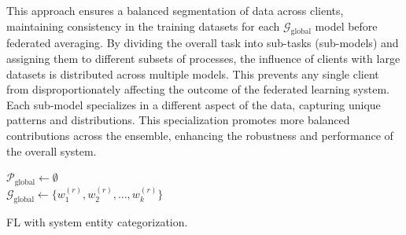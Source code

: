 This approach ensures a balanced segmentation of data across clients, maintaining consistency in the training datasets for each \( \mathcal{G}_{\text{global}} \) model before federated averaging. By dividing the overall task into sub-tasks (sub-models) and assigning them to different subsets of processes, the influence of clients with large datasets is distributed across multiple models. This prevents any single client from disproportionately affecting the outcome of the federated learning system. Each sub-model specializes in a different aspect of the data, capturing unique patterns and distributions. This specialization promotes more balanced contributions across the ensemble, enhancing the robustness and performance of the overall system.


\begin{algorithm}[!t]
  \scriptsize
  \DontPrintSemicolon
  \BlankLine
  $\mathcal{P}_{\text{global}} \leftarrow \emptyset$\\
  \BlankLine
  \BlankLine
  \BlankLine
  \BlankLine
  \BlankLine
  \Return $\mathcal{G}_{\text{global}} \leftarrow \{w_1^{(r)}, w_2^{(r)}, \ldots, w_k^{(r)}\}$\\
  \BlankLine
  \caption{FL with system entity categorization.}
  \label{alg:federated_provenance}
  \end{algorithm}  


